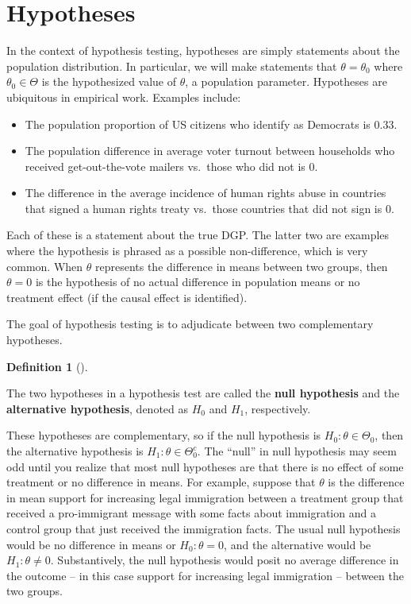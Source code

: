 \documentclass[
  letterpaper,
  DIV=11,
  numbers=noendperiod]{scrreprt}
\providecommand{\tightlist}{%
  \setlength{\itemsep}{0pt}\setlength{\parskip}{0pt}}\usepackage{longtable,booktabs,array}
\theoremstyle{definition}
\theoremstyle{definition}
\newtheorem{definition}{Definition}[chapter]
\theoremstyle{plain}
\theoremstyle{remark}
\begin{document}
\hypertarget{hypotheses}{%
\section{Hypotheses}\label{hypotheses}}

In the context of hypothesis testing, hypotheses are simply statements
about the population distribution. In particular, we will make
statements that \(\theta = \theta_0\) where \(\theta_0 \in \Theta\) is
the hypothesized value of \(\theta\), a population parameter. Hypotheses
are ubiquitous in empirical work. Examples include:

\begin{itemize}
\tightlist
\item
  The population proportion of US citizens who identify as Democrats is
  0.33.
\item
  The population difference in average voter turnout between households
  who received get-out-the-vote mailers vs.~those who did not is 0.
\item
  The difference in the average incidence of human rights abuse in
  countries that signed a human rights treaty vs.~those countries that
  did not sign is 0.
\end{itemize}

Each of these is a statement about the true DGP. The latter two are
examples where the hypothesis is phrased as a possible non-difference,
which is very common. When \(\theta\) represents the difference in means
between two groups, then \(\theta = 0\) is the hypothesis of no actual
difference in population means or no treatment effect (if the causal
effect is identified).

The goal of hypothesis testing is to adjudicate between two
complementary hypotheses.

\begin{definition}[]\protect\hypertarget{def-null}{}\label{def-null}

The two hypotheses in a hypothesis test are called the \textbf{null
hypothesis} and the \textbf{alternative hypothesis}, denoted as \(H_0\)
and \(H_1\), respectively.

\end{definition}

These hypotheses are complementary, so if the null hypothesis is
\(H_0: \theta \in \Theta_0\), then the alternative hypothesis is
\(H_1: \theta \in \Theta_0^c\). The ``null'' in null hypothesis may seem
odd until you realize that most null hypotheses are that there is no
effect of some treatment or no difference in means. For example, suppose
that \(\theta\) is the difference in mean support for increasing legal
immigration between a treatment group that received a pro-immigrant
message with some facts about immigration and a control group that just
received the immigration facts. The usual null hypothesis would be no
difference in means or \(H_0: \theta = 0\), and the alternative would be
\(H_1: \theta \neq 0\). Substantively, the null hypothesis would posit
no average difference in the outcome -- in this case support for
increasing legal immigration -- between the two groups.
\end{document}
